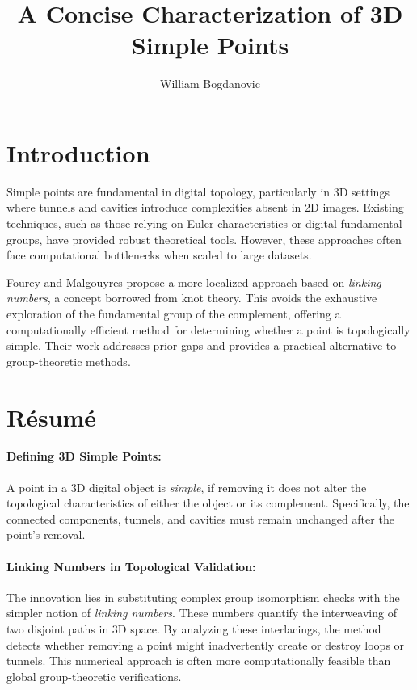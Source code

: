 \documentclass{llncs}
\begin{document}
\title{A Concise Characterization of 3D Simple Points}
\author{William Bogdanovic}
\maketitle

\section*{Introduction}

Simple points are fundamental in digital topology, particularly in 3D settings where tunnels and cavities introduce complexities absent in 2D images. Existing techniques, such as those relying on Euler characteristics or digital fundamental groups, have provided robust theoretical tools. However, these approaches often face computational bottlenecks when scaled to large datasets.

Fourey and Malgouyres propose a more localized approach based on \emph{linking numbers}, a concept borrowed from knot theory. This avoids the exhaustive exploration of the fundamental group of the complement, offering a computationally efficient method for determining whether a point is topologically simple. Their work addresses prior gaps and provides a practical alternative to group-theoretic methods.

\section*{Résumé}

\paragraph{Defining 3D Simple Points:}
A point in a 3D digital object is \emph{simple}, if removing it does not alter the topological characteristics of either the object or its complement. Specifically, the connected components, tunnels, and cavities must remain unchanged after the point's removal.

\paragraph{Linking Numbers in Topological Validation:}
The innovation lies in substituting complex group isomorphism checks with the simpler notion of \emph{linking numbers}. These numbers quantify the interweaving of two disjoint paths in 3D space. By analyzing these interlacings, the method detects whether removing a point might inadvertently create or destroy loops or tunnels. This numerical approach is often more computationally feasible than global group-theoretic verifications.
\end{document}
